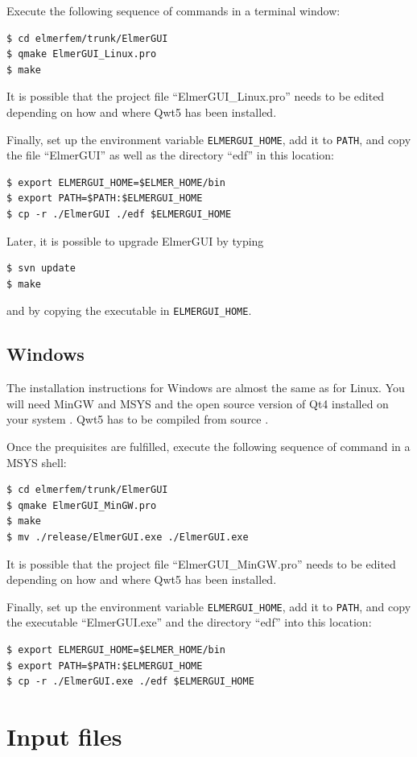 \documentclass[a4paper,12pt]{article}
\begin{document}
Execute the following sequence of commands in a terminal window:
\begin{verbatim}
$ cd elmerfem/trunk/ElmerGUI
$ qmake ElmerGUI_Linux.pro
$ make
\end{verbatim}
It is possible that the project file ``ElmerGUI\_Linux.pro'' needs to be edited depending on how and where Qwt5 has been installed.

Finally, set up the environment variable {\tt ELMERGUI\_HOME}, add it to {\tt PATH}, and copy the file ``ElmerGUI'' as well as the directory ``edf'' in this location:
\begin{verbatim}
$ export ELMERGUI_HOME=$ELMER_HOME/bin
$ export PATH=$PATH:$ELMERGUI_HOME
$ cp -r ./ElmerGUI ./edf $ELMERGUI_HOME
\end{verbatim}

Later, it is possible to upgrade ElmerGUI by typing
\begin{verbatim}
$ svn update
$ make
\end{verbatim}
and by copying the executable in {\tt ELMERGUI\_HOME}.


\subsection{Windows}

The installation instructions for Windows are almost the same as for Linux. You will need  MinGW and MSYS and the open source version of Qt4 installed on your system \cite{QtHome}.  Qwt5 has to be compiled from source \cite{QwtHome}.

Once the prequisites are fulfilled, execute the following sequence of command in a MSYS shell:
\begin{verbatim}
$ cd elmerfem/trunk/ElmerGUI
$ qmake ElmerGUI_MinGW.pro
$ make
$ mv ./release/ElmerGUI.exe ./ElmerGUI.exe
\end{verbatim}
It is possible that the project file ``ElmerGUI\_MinGW.pro'' needs to be edited depending on how and where Qwt5 has been installed.

Finally, set up the environment variable {\tt ELMERGUI\_HOME}, add it to {\tt PATH}, and copy the executable ``ElmerGUI.exe'' and the directory ``edf'' into this location:
\begin{verbatim}
$ export ELMERGUI_HOME=$ELMER_HOME/bin
$ export PATH=$PATH:$ELMERGUI_HOME
$ cp -r ./ElmerGUI.exe ./edf $ELMERGUI_HOME
\end{verbatim}

\section{Input files}
\end{document}
